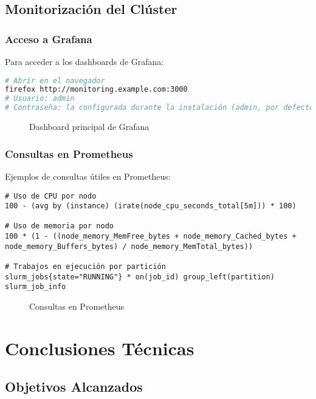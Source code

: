 \documentclass[12pt,a4paper]{report}
\begin{document}
\section{Monitorización del Clúster}

\subsection{Acceso a Grafana}

Para acceder a los dashboards de Grafana:

\begin{lstlisting}[language=bash]
# Abrir en el navegador
firefox http://monitoring.example.com:3000
# Usuario: admin
# Contraseña: la configurada durante la instalación (admin, por defecto)
\end{lstlisting}

\begin{figure}[H]
\centering
\caption{Dashboard principal de Grafana}
\label{fig:grafana_main}
\end{figure}

\subsection{Consultas en Prometheus}

Ejemplos de consultas útiles en Prometheus:

\begin{lstlisting}
# Uso de CPU por nodo
100 - (avg by (instance) (irate(node_cpu_seconds_total[5m])) * 100)

# Uso de memoria por nodo
100 * (1 - ((node_memory_MemFree_bytes + node_memory_Cached_bytes + node_memory_Buffers_bytes) / node_memory_MemTotal_bytes))

# Trabajos en ejecución por partición
slurm_jobs{state="RUNNING"} * on(job_id) group_left(partition) slurm_job_info
\end{lstlisting}

\begin{figure}[H]
\centering
\caption{Consultas en Prometheus}
\label{fig:prometheus_queries}
\end{figure}

\chapter{Conclusiones Técnicas}

\section{Objetivos Alcanzados}
\end{document}
